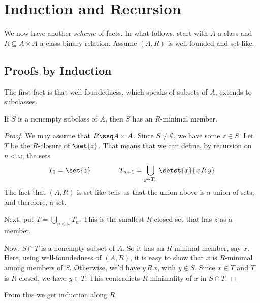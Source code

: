 \section{Induction and Recursion}

We now have another \textit{scheme} of facts. In what follows, start with $A$ a class and $R \subseteq A \times A$ a class binary relation. Assume $(A, R)$ is well-founded and set-like.

\subsection{Proofs by Induction}

The first fact is that well-foundedness, which speaks of subsets of $A$, extends to subclasses.

\begin{boxproposition}
    If $S$ is a nonempty subclass of $A$, then $S$ has an $R$-minimal member.
\end{boxproposition}
\begin{proof}
    We may assume that $R \ssq A \times A$. Since $S \ne \emptyset$, we have some $z \in S$. Let $T$ be the $R$-closure of $\set{z}$. That means that we can define, by recursion on $n < \omega$, the sets
    \begin{align*}
        T_0 = \set{z}
        \qquad \qquad
        T_{n + 1} = \bigcup_{y \in T_n} \setst{x}{x \, R \, y}
    \end{align*}
    The fact that $(A, R)$ is set-like tells us that the union above is a union of sets, and therefore, a set.

    Next, put $T = \bigcup_{n < \omega} T_n$. This is the smallest $R$-closed set that has $z$ as a member.

    Now, $S \cap T$ is a nonempty subset of $A$. So it has an $R$-minimal member, say $x$. Here, using well-foundedness of $(A, R)$, it is easy to show that $x$ is $R$-minimal among members of $S$. Otherwise, we'd have $y \, R \, x$, with $y \in S$. Since $x \in T$ and $T$ is $R$-closed, we have $y \in T$. This contradicts $R$-minimality of $x$ in $S \cap T$.
\end{proof}

From this we get induction along $R$.

